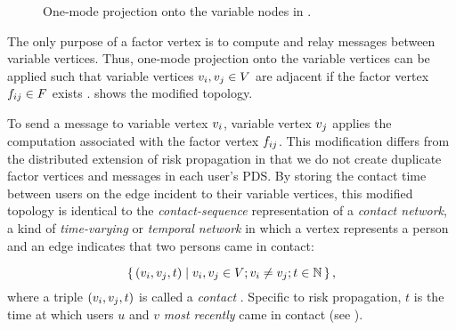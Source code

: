 \begin{figure}[htbp]
\centering
{}
\caption[One-mode projection of a factor graph]{One-mode projection
onto the variable nodes in .}
\label{fig:projected}
\end{figure}

The only purpose of a factor vertex is to compute and relay messages between variable vertices. Thus, one-mode projection onto the variable vertices can be applied such that variable vertices $\vVariable[i],\vVariable[j] \in \vVariables$ are adjacent if the factor vertex $\vFactor[ij] \in \vFactors$ exists \cite{Zhou2007}.  shows the modified topology.

To send a message to variable vertex $\vVariable[i]$, variable vertex $\vVariable[j]$ applies the computation associated with the factor vertex $\vFactor[ij]$. This modification differs from the distributed extension of risk propagation \cite{Ayday2021} in that we do not create duplicate factor vertices and messages in each user's PDS. By storing the contact time between users on the edge incident to their variable vertices, this modified topology is identical to the \emph{contact-sequence} representation of a \emph{contact network}, a kind of \emph{time-varying} or \emph{temporal network} in which a vertex represents a person and an edge indicates that two persons came in contact:

\begin{equation}
    \setBuilder{(\vVariable[i], \vVariable[j], t)}{\vVariable[i], \vVariable[j] \in \vVariables; \vVariable[i] \neq \vVariable[j]; t \in \naturals}, \label{eq:contact-seq}
\end{equation}
%
where a triple $(\vVariable[i], \vVariable[j], t)$ is called a \emph{contact} \cite{Holme2012}. Specific to risk propagation, $t$ is the time at which users $u$ and $v$ \emph{most recently} came in contact (see ).

